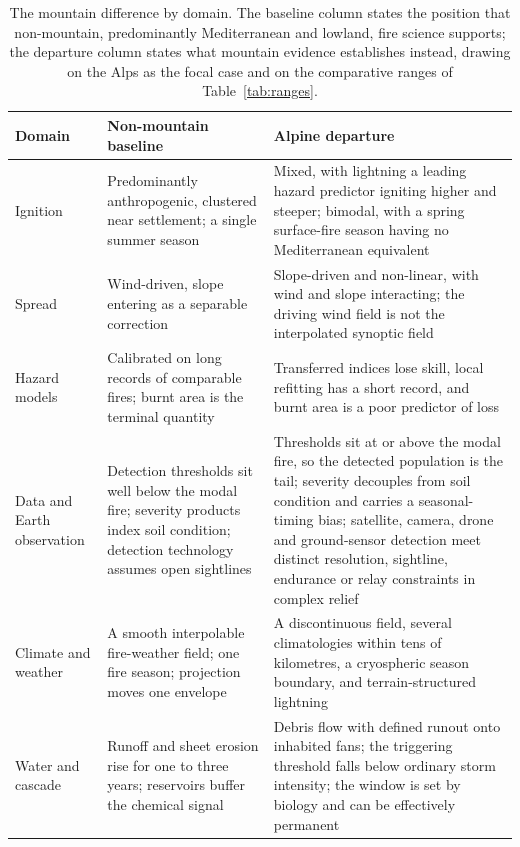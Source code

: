\documentclass[11pt,a4paper]{article}
\begin{document}
\begin{table}[htbp]
\centering
\small
\setlength{\tabcolsep}{4pt}
\renewcommand{\arraystretch}{1.15}
\caption{The mountain difference by domain. The baseline column states the position that non-mountain, predominantly Mediterranean and lowland, fire science supports; the departure column states what mountain evidence establishes instead, drawing on the Alps as the focal case and on the comparative ranges of Table~\ref{tab:ranges}.}
\label{tab:contrast}
\begin{tabularx}{\textwidth}{@{}>{\raggedright\arraybackslash}p{2.2cm} >{\raggedright\arraybackslash}X >{\raggedright\arraybackslash}X@{}}
\toprule
\textbf{Domain} & \textbf{Non-mountain baseline} & \textbf{Alpine departure} \\
\midrule
Ignition & Predominantly anthropogenic, clustered near settlement; a single summer season & Mixed, with lightning a leading hazard predictor igniting higher and steeper; bimodal, with a spring surface-fire season having no Mediterranean equivalent \\
Spread & Wind-driven, slope entering as a separable correction & Slope-driven and non-linear, with wind and slope interacting; the driving wind field is not the interpolated synoptic field \\
Hazard models & Calibrated on long records of comparable fires; burnt area is the terminal quantity & Transferred indices lose skill, local refitting has a short record, and burnt area is a poor predictor of loss \\
Data and Earth observation & Detection thresholds sit well below the modal fire; severity products index soil condition; detection technology assumes open sightlines & Thresholds sit at or above the modal fire, so the detected population is the tail; severity decouples from soil condition and carries a seasonal-timing bias; satellite, camera, drone and ground-sensor detection meet distinct resolution, sightline, endurance or relay constraints in complex relief \\
Climate and weather & A smooth interpolable fire-weather field; one fire season; projection moves one envelope & A discontinuous field, several climatologies within tens of kilometres, a cryospheric season boundary, and terrain-structured lightning \\
Water and cascade & Runoff and sheet erosion rise for one to three years; reservoirs buffer the chemical signal & Debris flow with defined runout onto inhabited fans; the triggering threshold falls below ordinary storm intensity; the window is set by biology and can be effectively permanent \\

\end{tabularx}
\end{table}
\end{document}
